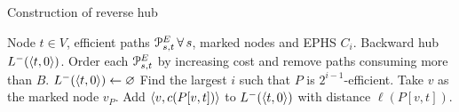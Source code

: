 \begin{algorithm}[h]
	\small
	\caption{Construction of reverse hub}
	\label{alg:reversehub}
	\begin{algorithmic}[1]
		\Require Node $t\in V$, efficient paths $\mathcal{P}_{s,t}^E\,\forall\,s$, marked nodes and EPHS $C_i$.
		\Ensure Backward hub $L^-(\langle t,0\rangle)$.
		\State Order each $\mathcal{P}_{s,t}^E$ by increasing cost and remove paths consuming more than $B$.
		\State $L^-(\langle t,0\rangle)\gets \varnothing$
		\State Find the largest $i$ such that $P$ is $2^{i-1}$-efficient.
		\State Take $v$ as the marked node $v_P$.
		\State Add $\langle v,c(P[v,t])\rangle$ to $L^-(\langle t,0\rangle)$ with distance $\ell(P[v,t])$.
		\EndFor
		\EndFor
	\end{algorithmic}
\end{algorithm}


